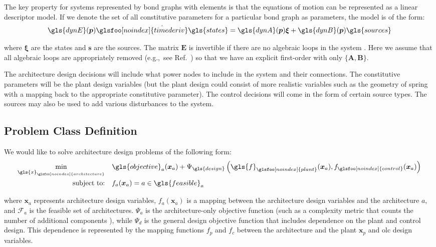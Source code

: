 The key property for systems represented by bond graphs with  elements is that the equations of motion can be represented as a linear descriptor model.
If we denote the set of all constitutive parameters for a particular bond graph as \gls{parameters}, the model is of the form:
\begin{align}
\gls{dynE}(\bm{p}) \dot{\glsfoo[noindex]{timederiv}\gls{states}} = \gls{dynA}(\bm{p}) \bm{\xi} + \gls{dynB}(\bm{p}) \gls{sources}
\end{align} 

\noindent where $\bm{\xi}$ are the states and $\bm{s}$ are the sources.
The matrix $\bm{E}$ is invertible if there are no algebraic loops in the system \cite{Gonzalez2008a, Borutzky2010a}.
Here we assume that all algebraic loops are appropriately removed (e.g.,~see Ref.~\cite{Gonzalez2008a}) so that we have an explicit first-order  with only $\{\bm{A}, \bm{B}\}$.

The architecture design decisions will include what power nodes to include in the system and their connections.
The constitutive parameters will be the plant design variables (but the plant design could consist of more realistic variables such as the geometry of spring with a mapping back to the appropriate constitutive parameter).
The control decisions will come in the form of certain source types.
The sources may also be used to add various disturbances to the system.

\subsection{Problem Class Definition}

We would like to solve architecture design problems of the following form:
\begin{subequations}
\label{eq:ch8:levela}
\begin{align}
\min_{\gls{x}_{\glsfoo[noindex]{architecture}}} \quad & \gls{objective}_a(\bm{x}_a) + \Psi_{\gls{design}}\left( \gls{f}_{\glsfoo[noindex]{plant}}(\bm{x}_a), f_{\glsfoo[noindex]{control}}(\bm{x}_a) \right) \\
\text{subject to:} \quad & f_a(\bm{x}_a) = a \in \gls{feasible}_a
\end{align}
\end{subequations}

\noindent where $\bm{x}_a$ represents architecture design variables, $f_a(\bm{x}_a)$ is a mapping between the architecture design variables and the architecture $a$, and $\mathcal{F}_a$ is the feasible set of architectures.
$\Psi_a$ is the architecture-only objective function (such as a complexity metric that counts the number of additional components \cite{manuscript-pm-circuits}), while $\Psi_d$ is the general design objective function that includes dependence on the plant and control design.
This dependence is represented by the mapping functions $f_p$ and $f_c$ between the architecture and the plant $\bm{x}_p$ and  \gls{olc} design variables. 

